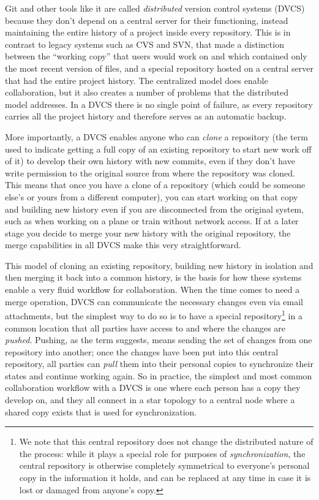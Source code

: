 \documentclass[ChapterTOCs,krantz2]{krantz} %
\begin{document}
Git and other tools like it are called \emph{distributed} version control
systems (DVCS) because they don't depend on a central server for their functioning,
instead maintaining the entire history of a project inside every repository.
This is in contrast to legacy systems such as CVS and SVN, that made a
distinction between the ``working copy'' that users would work on and which
contained only the most recent version of files, and a special repository
hosted on a central server that had the entire project history.  The
centralized model does enable collaboration, but it also creates a number of
problems that the distributed model addresses.  In a DVCS there is no single
point of failure, as every repository carries all the project history and
therefore serves as an automatic backup.

More importantly, a DVCS enables anyone who can \emph{clone} a repository (the
term used to indicate getting a full copy of an existing repository to start
new work off of it) to develop their own history with new commits, even if they
don't have write permission to the original source from where the repository
was cloned.  This means that once you have a clone of a repository (which could
be someone else's or yours from a different computer), you can start working on
that copy and building new history even if you are disconnected from the
original system, such as when working on a plane or train without network
access.  If at a later stage you decide to merge your new history with the
original repository, the merge capabilities in all DVCS make this very
straightforward.

This model of cloning an existing repository, building new history in isolation
and then merging it back into a common history, is the basis for how these
systems enable a very fluid workflow for collaboration.  When the time comes to
need a merge operation, DVCS can communicate the necessary changes even
via email attachments, but the simplest way to do so is to have a special
repository\footnote{We note that this central repository does not change the
  distributed nature of the process: while it plays a special role for purposes
  of \emph{synchronization}, the central repository is otherwise completely
  symmetrical to everyone's personal copy in the information it holds, and can
  be replaced at any time in case it is lost or damaged from anyone's copy.} in
a common location that all parties have access to and where the changes are
\emph{pushed}.  Pushing, as the term suggests, means sending the set of
changes from one repository into another; once the changes have been put into
this central repository, all parties can \emph{pull} them into their personal
copies to synchronize their states and continue working again.  So in practice,
the simplest and most common collaboration workflow with a DVCS is one where
each person has a copy they develop on, and they all connect in a star topology
to a central node where a shared copy exists that is used for synchronization.
\end{document}
